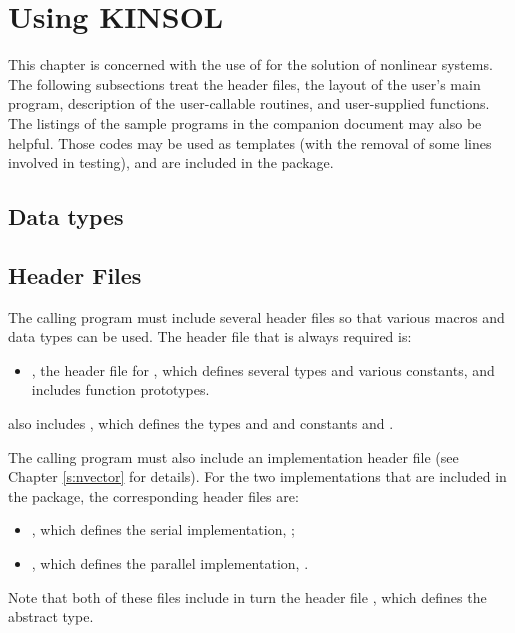 \chapter{Using KINSOL}\label{c:usage}

This chapter is concerned with the use of {\kinsol} for the solution
of nonlinear systems.  The following subsections treat the header
files, the layout of the user's main program, description of the
{\kinsol} user-callable routines, and user-supplied functions.  The
listings of the sample programs in the companion document
\cite{kinsol2.2.0_ex} may also be helpful.  Those codes may be used as
templates (with the removal of some lines involved in testing), and
are included in the {\kinsol} package.

\section{Data types}\label{s:types}


\section{Header Files}\label{s:header_sol}

The calling program must include several header files so that various macros
and data types can be used. The header file that is always required is:
%
\begin{itemize}
\item  {}, 
  the header file for {\kinsol}, which defines several
  types and various constants, and includes function prototypes.
\end{itemize}
%
 also includes , 
which defines the types  and 
and constants  and .

The calling program must also include an {\nvector} implementation header file
(see Chapter \ref{s:nvector} for details).
For the two {\nvector} implementations that are included in the {\kinsol} package,
the corresponding header files are:
%
\begin{itemize}
\item {}, 
  which defines the serial implementation, {\nvecs};
\item {}, 
  which defines the parallel {\mpi} implementation, {\nvecp}.
\end{itemize}
%
Note that both of these files include in turn the header file , which 
defines the abstract  type. 

